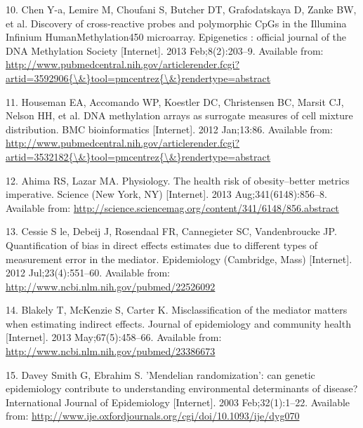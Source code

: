 \documentclass[]{article}
\begin{document}
\hypertarget{ref-Chen2013a}{}
10. Chen Y-a, Lemire M, Choufani S, Butcher DT, Grafodatskaya D, Zanke
BW, et al. Discovery of cross-reactive probes and polymorphic CpGs in
the Illumina Infinium HumanMethylation450 microarray. Epigenetics :
official journal of the DNA Methylation Society {[}Internet{]}. 2013
Feb;8(2):203--9. Available from:
\href{http://www.pubmedcentral.nih.gov/articlerender.fcgi?artid=3592906\%7B/\&\%7Dtool=pmcentrez\%7B/\&\%7Drendertype=abstract}{http://www.pubmedcentral.nih.gov/articlerender.fcgi?artid=3592906\{\textbackslash{}\&\}tool=pmcentrez\{\textbackslash{}\&\}rendertype=abstract}

\hypertarget{ref-Houseman2012}{}
11. Houseman EA, Accomando WP, Koestler DC, Christensen BC, Marsit CJ,
Nelson HH, et al. DNA methylation arrays as surrogate measures of cell
mixture distribution. BMC bioinformatics {[}Internet{]}. 2012 Jan;13:86.
Available from:
\href{http://www.pubmedcentral.nih.gov/articlerender.fcgi?artid=3532182\%7B/\&\%7Dtool=pmcentrez\%7B/\&\%7Drendertype=abstract}{http://www.pubmedcentral.nih.gov/articlerender.fcgi?artid=3532182\{\textbackslash{}\&\}tool=pmcentrez\{\textbackslash{}\&\}rendertype=abstract}

\hypertarget{ref-Ahima2013}{}
12. Ahima RS, Lazar MA. Physiology. The health risk of obesity--better
metrics imperative. Science (New York, NY) {[}Internet{]}. 2013
Aug;341(6148):856--8. Available from:
\url{http://science.sciencemag.org/content/341/6148/856.abstract}

\hypertarget{ref-LeCessie2012}{}
13. Cessie S le, Debeij J, Rosendaal FR, Cannegieter SC, Vandenbroucke
JP. Quantification of bias in direct effects estimates due to different
types of measurement error in the mediator. Epidemiology (Cambridge,
Mass) {[}Internet{]}. 2012 Jul;23(4):551--60. Available from:
\url{http://www.ncbi.nlm.nih.gov/pubmed/22526092}

\hypertarget{ref-Blakely2013}{}
14. Blakely T, McKenzie S, Carter K. Misclassification of the mediator
matters when estimating indirect effects. Journal of epidemiology and
community health {[}Internet{]}. 2013 May;67(5):458--66. Available from:
\url{http://www.ncbi.nlm.nih.gov/pubmed/23386673}

\hypertarget{ref-DaveySmith2003}{}
15. Davey Smith G, Ebrahim S. 'Mendelian randomization': can genetic
epidemiology contribute to understanding environmental determinants of
disease? International Journal of Epidemiology {[}Internet{]}. 2003
Feb;32(1):1--22. Available from:
\url{http://www.ije.oxfordjournals.org/cgi/doi/10.1093/ije/dyg070}
\end{document}
